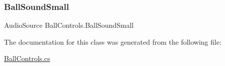\subsubsection{\texorpdfstring{Ball\+Sound\+Small}{BallSoundSmall}}
{\footnotesize\ttfamily Audio\+Source Ball\+Controls.\+Ball\+Sound\+Small\hspace{0.3cm}{\ttfamily [private]}}



The documentation for this class was generated from the following file\+:\begin{DoxyCompactItemize}
\item 
\mbox{\hyperlink{_ball_controls_8cs}{Ball\+Controls.\+cs}}\end{DoxyCompactItemize}
